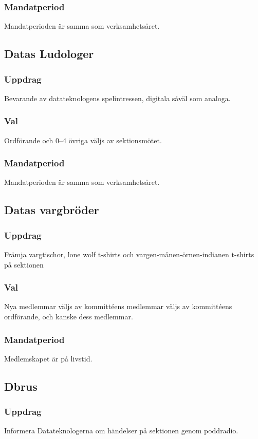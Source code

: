 \subsubsection{Mandatperiod}
Mandatperioden är samma som verksamhetsåret. 

\subsection{Datas Ludologer}
\subsubsection{Uppdrag}
Bevarande av datateknologens spelintressen, digitala såväl som analoga.
\subsubsection{Val}
Ordförande och 0--4 övriga väljs av sektionsmötet.
\subsubsection{Mandatperiod}
Mandatperioden är samma som verksamhetsåret. 

\subsection{Datas vargbröder}
\subsubsection{Uppdrag}
Främja vargtischor, lone wolf t-shirts och vargen-månen-örnen-indianen t-shirts på sektionen 
\subsubsection{Val}
Nya medlemmar väljs av kommittéens medlemmar väljs av kommittéens ordförande, och kanske dess medlemmar.
\subsubsection{Mandatperiod}
Medlemskapet är på livstid.

\subsection{Dbrus}
\subsubsection{Uppdrag}
Informera Datateknologerna om händelser på sektionen genom poddradio.
